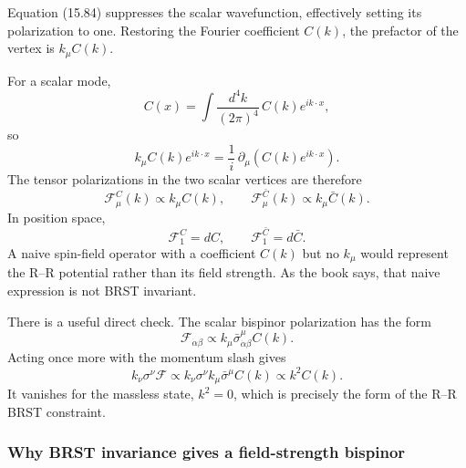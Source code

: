 \documentclass[
  10pt,
  a4paper,
  openany]{book}
\begin{document}
Equation (15.84) suppresses the scalar wavefunction, effectively setting
its polarization to one. Restoring the Fourier coefficient \(C(k)\), the
prefactor of the vertex is \(k_\mu C(k)\).

For a scalar mode, \[
C(x)
=
\int\frac{d^4k}{(2\pi)^4}\,
C(k)e^{ik\cdot x},
\] so \[
k_\mu C(k)e^{ik\cdot x}
=
\frac1i\,\partial_\mu
\left(C(k)e^{ik\cdot x}\right).
\] The tensor polarizations in the two scalar vertices are therefore \[
\mathcal F_{\mu}^{C}(k)\propto k_\mu C(k),
\qquad
\mathcal F_{\mu}^{\bar C}(k)\propto k_\mu\bar C(k).
\] In position space, \[
\boxed{
\mathcal F_1^C=dC,
\qquad
\mathcal F_1^{\bar C}=d\bar C.
}
\] A naive spin-field operator with a coefficient \(C(k)\) but no
\(k_\mu\) would represent the R--R potential rather than its field
strength. As the book says, that naive expression is not BRST invariant.

There is a useful direct check. The scalar bispinor polarization has the
form \[
\mathcal F_{\dot\alpha\beta}
\propto
k_\mu\bar\sigma^\mu_{\dot\alpha\beta}C(k).
\] Acting once more with the momentum slash gives \[
k_\nu\sigma^\nu
\mathcal F
\propto
k_\nu\sigma^\nu k_\mu\bar\sigma^\mu C(k)
\propto
k^2C(k).
\] It vanishes for the massless state, \(k^2=0\), which is precisely the
form of the R--R BRST constraint.

\subsubsection{Why BRST invariance gives a field-strength
bispinor}\label{why-brst-invariance-gives-a-field-strength-bispinor}
\end{document}
